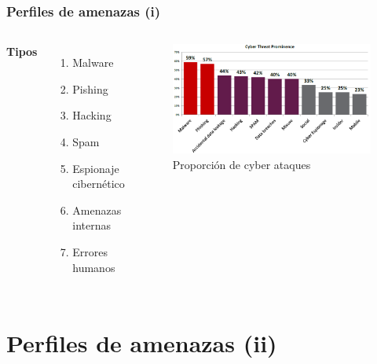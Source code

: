 \documentclass{beamer}
\begin{document}
\begin{frame}
\frametitle{Perfiles de amenazas (i)}
\begin{columns}[c] %

\textbf{Tipos}
\begin{enumerate}
\item Malware
\item Pishing
\item Hacking
\item Spam
\item Espionaje cibernético
\item Amenazas internas
\item Errores humanos
\end{enumerate}

\begin{figure}[htb]
\centering
\includegraphics[width=0.55\paperwidth]{img1.png}
\caption{Proporción de cyber ataques}%
\end{figure}

\end{columns}
\end{frame}

\section{Perfiles de amenazas (ii)}
\end{document}
